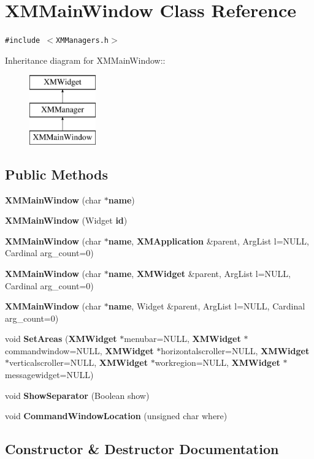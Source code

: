 \section{XMMain\-Window  Class Reference}
\label{classXMMainWindow}
{\tt \#include $<$XMManagers.h$>$}

Inheritance diagram for XMMain\-Window::\begin{figure}[H]
\begin{center}
\leavevmode
\includegraphics[height=3cm]{classXMMainWindow}
\end{center}
\end{figure}
\subsection*{Public Methods}
\begin{CompactItemize}
\item 
{\bf XMMain\-Window} (char $\ast${\bf name})
\item 
{\bf XMMain\-Window} (Widget {\bf id})
\item 
{\bf XMMain\-Window} (char $\ast${\bf name}, {\bf XMApplication} \&parent, Arg\-List l=NULL, Cardinal arg\_\-count=0)
\item 
{\bf XMMain\-Window} (char $\ast${\bf name}, {\bf XMWidget} \&parent, Arg\-List l=NULL, Cardinal arg\_\-count=0)
\item 
{\bf XMMain\-Window} (char $\ast${\bf name}, Widget \&parent, Arg\-List l=NULL, Cardinal arg\_\-count=0)
\item 
void {\bf Set\-Areas} ({\bf XMWidget} $\ast$menubar=NULL, {\bf XMWidget} $\ast$commandwindow=NULL, {\bf XMWidget} $\ast$horizontalscroller=NULL, {\bf XMWidget} $\ast$verticalscroller=NULL, {\bf XMWidget} $\ast$workregion=NULL, {\bf XMWidget} $\ast$messagewidget=NULL)
\item 
void {\bf Show\-Separator} (Boolean show)
\item 
void {\bf Command\-Window\-Location} (unsigned char where)
\end{CompactItemize}


\subsection{Constructor \& Destructor Documentation}
